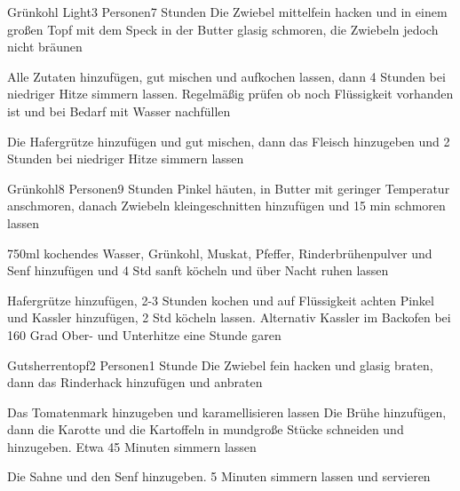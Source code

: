 \begin{recipe}{Grünkohl Light}{3 Personen}{7 Stunden}
Die Zwiebel mittelfein hacken und in einem großen Topf mit dem Speck in der Butter glasig schmoren, die Zwiebeln jedoch nicht bräunen

Alle Zutaten hinzufügen, gut mischen und aufkochen lassen, dann 4 Stunden bei niedriger Hitze simmern lassen. Regelmäßig prüfen ob noch Flüssigkeit vorhanden ist und bei Bedarf mit Wasser nachfüllen

Die Hafergrütze hinzufügen und gut mischen, dann das Fleisch hinzugeben und 2 Stunden bei niedriger Hitze simmern lassen

\end{recipe} 


\begin{recipe}{Grünkohl}{8 Personen}{9 Stunden}
Pinkel häuten, in Butter mit geringer Temperatur anschmoren, danach Zwiebeln kleingeschnitten hinzufügen und 15 min schmoren lassen

750ml kochendes Wasser, Grünkohl, Muskat, Pfeffer, Rinderbrühenpulver und Senf hinzufügen und 4 Std sanft köcheln und über Nacht ruhen lassen

Hafergrütze hinzufügen, 2-3 Stunden kochen und auf Flüssigkeit achten
Pinkel und Kassler hinzufügen, 2 Std köcheln lassen. Alternativ Kassler im Backofen bei 160 Grad Ober- und Unterhitze eine Stunde garen
\end{recipe}


\begin{recipe}{Gutsherrentopf}{2 Personen}{1 Stunde}
Die Zwiebel fein hacken und glasig braten, dann das Rinderhack hinzufügen und anbraten

Das Tomatenmark hinzugeben und karamellisieren lassen
Die Brühe hinzufügen, dann die Karotte und die Kartoffeln in mundgroße Stücke schneiden und hinzugeben. Etwa 45 Minuten simmern lassen 

Die Sahne und den Senf hinzugeben.
5 Minuten simmern lassen und servieren
\end{recipe}

